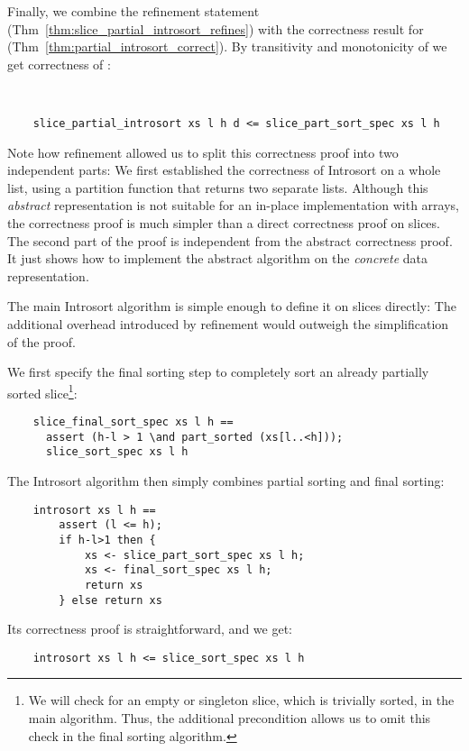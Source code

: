 \documentclass[sigplan,10pt,anonymous,review]{acmart}\settopmatter{printfolios=true,printccs=false,printacmref=false}
\theoremstyle{definition}
\begin{document}
  Finally, we combine the refinement statement (Thm~\ref{thm:slice_partial_introsort_refines}) with the
  correctness result for  (Thm~\ref{thm:partial_introsort_correct}).
  By transitivity and monotonicity of  we get correctness of :
  \begin{theorem}\label{thm:slice_partial_introsort_correct}
  {\ }\vspace*{-.5em}

  \begin{lstlisting}
    slice_partial_introsort xs l h d <= slice_part_sort_spec xs l h
  \end{lstlisting}
  \end{theorem}
  Note how refinement allowed us to split this correctness proof into two independent parts:
  We first established the correctness of Introsort on a whole list, using a partition function that returns two separate lists.
  Although this \emph{abstract} representation is not suitable for an in-place implementation with arrays, the correctness proof is much simpler than a
  direct correctness proof on slices. The second part of the proof is independent from the abstract correctness proof.
  It just shows how to implement the abstract algorithm on the \emph{concrete} data representation.


  The main Introsort algorithm is simple enough to define it on slices directly:
  The additional overhead introduced by refinement would outweigh the
  simplification of the proof.

  We first specify the final sorting step to completely sort an already partially sorted slice\footnote{
    We will check for an empty or singleton slice, which is trivially sorted, in the main algorithm.
    Thus, the additional precondition  allows us to omit this check in the final sorting algorithm.
  }:
  \begin{lstlisting}
    slice_final_sort_spec xs l h ==
      assert (h-l > 1 \and part_sorted (xs[l..<h]));
      slice_sort_spec xs l h
  \end{lstlisting}
  The Introsort algorithm then simply combines partial sorting and final sorting:
  \begin{lstlisting}
    introsort xs l h ==
        assert (l <= h);
        if h-l>1 then {
            xs <- slice_part_sort_spec xs l h;
            xs <- final_sort_spec xs l h;
            return xs
        } else return xs
  \end{lstlisting}
  Its correctness proof is straightforward, and we get:
  \begin{theorem}\label{thm:introsort_correct}
    \begin{lstlisting}
    introsort xs l h <= slice_sort_spec xs l h
    \end{lstlisting}
  \end{theorem}
\end{document}
